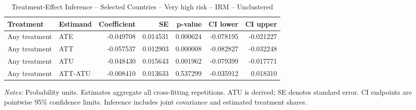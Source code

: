 \begin{table}[htbp]
\centering
\caption{Treatment-Effect Inference -- Selected Countries -- Very high risk -- IRM -- Unclustered}
\label{tab:inference-VeryHighRiskHome-IRM-iid-selected-countries}
\scriptsize
\begin{adjustbox}{max width=\linewidth}
\begin{tabular}{llrrrrr}
\toprule
Treatment & Estimand & Coefficient & SE & p-value & CI lower & CI upper \\
\midrule
Any treatment & ATE & -0.049708 & 0.014531 & 0.000624 & -0.078195 & -0.021227 \\
Any treatment & ATT & -0.057537 & 0.012903 & 0.000008 & -0.082827 & -0.032248 \\
Any treatment & ATU & -0.048430 & 0.015643 & 0.001962 & -0.079399 & -0.017771 \\
Any treatment & ATT-ATU & -0.008410 & 0.013633 & 0.537299 & -0.035912 & 0.018310 \\
\bottomrule
\end{tabular}

\end{adjustbox}
\par\smallskip
\begin{minipage}{\linewidth}\scriptsize \textit{Notes:} Probability units. Estimates aggregate all cross-fitting repetitions. ATU is derived; SE denotes standard error. CI endpoints are pointwise 95\% confidence limits. Inference includes joint covariance and estimated treatment shares. \end{minipage}
\end{table}

